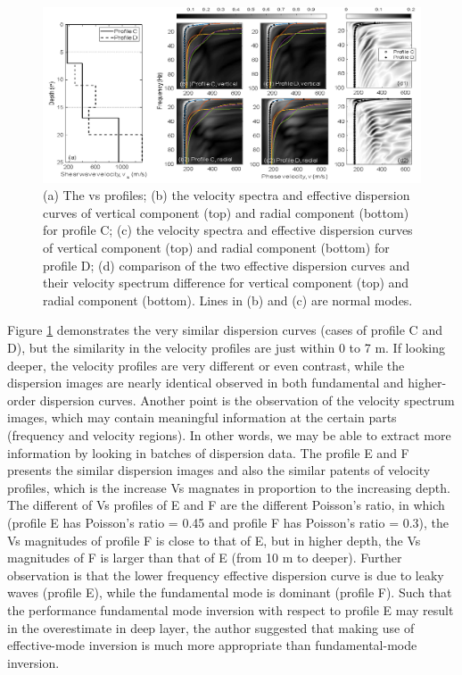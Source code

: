 \begin{figure}
    \centering
    \includegraphics[scale=0.45]{images/VsCD.png}
    \caption{(a) The vs profiles; (b) the velocity spectra and effective dispersion curves of vertical component (top) and radial component (bottom) for profile C; (c) the velocity spectra and effective dispersion curves of vertical component (top) and radial component (bottom) for profile D; (d) comparison of the two effective dispersion curves and their velocity spectrum difference for vertical component (top) and radial component (bottom). Lines in (b) and (c) are normal modes.}
    \label{fig:VsCD}
\end{figure}

Figure \ref{fig:VsCD} demonstrates the very similar dispersion curves (cases of profile C and D), but the similarity in the velocity profiles are just within 0 to 7 m. If looking deeper, the velocity profiles are very different or even contrast, while the dispersion images are nearly identical observed in both fundamental and higher-order dispersion curves. Another point is the observation of the velocity spectrum images, which may contain meaningful information at the certain parts (frequency and velocity regions). In other words, we may be able to extract more information by looking in batches of dispersion data. The profile E and F presents the similar dispersion images and also the similar patents of velocity profiles, which is the increase Vs magnates in proportion to the increasing depth. The different of Vs profiles of E and F are the different Poisson’s ratio, in which (profile E has Poisson's ratio = 0.45 and profile F has Poisson's ratio = 0.3), the Vs magnitudes of profile F is close to that of E, but in higher depth, the Vs magnitudes of F is larger than that of E (from 10 m to deeper). Further observation is that the lower frequency effective dispersion curve is due to leaky waves (profile E), while the fundamental mode is dominant (profile F). Such that the performance fundamental mode inversion with respect to profile E may result in the overestimate in deep layer, the author suggested that making use of effective-mode inversion is much more appropriate than fundamental-mode inversion.

